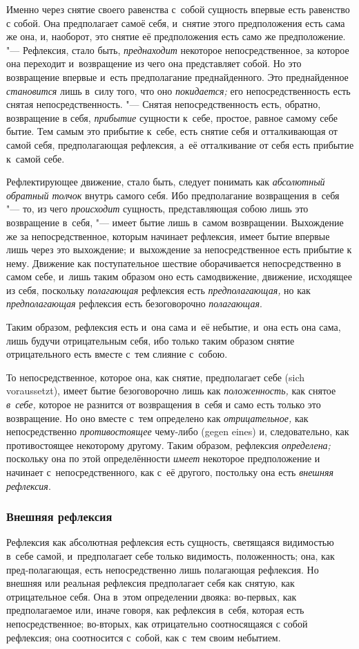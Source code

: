 Именно через снятие своего равенства с~собой сущность впервые есть равенство
с собой. Она предполагает самоё себя, и~снятие этого предположения есть
сама же она, и, наоборот, это снятие её предположения есть само же
предположение. "--- Рефлексия, стало быть,
{\em преднаходит} некоторое непосредственное, за
которое она переходит и~возвращение из чего она представляет собой. Но это
возвращение впервые и~есть предполагание преднайденного. Это преднайденное
{\em становится} лишь в~силу того, что оно
{\em покидается;} его непосредственность есть снятая
непосредственность. "--- Снятая непосредственность есть, обратно, возвращение
в себя, {\em прибытие} сущности к~себе, простое, равное
самому себе бытие. Тем самым это прибытие к~себе, есть снятие себя и
отталкивающая от самой себя, предполагающая рефлексия, а~её отталкивание от
себя есть прибытие к~самой себе.

Рефлектирующее движение, стало быть, следует понимать как
{\em абсолютный обратный толчок} внутрь самого себя.
Ибо предполагание возвращения в~себя "--- то, из чего
{\em происходит} сущность, представляющая собою лишь
это возвращение в~себя, "--- имеет бытие лишь в~самом возвращении. Выхождение
же за непосредственное, которым начинает рефлексия, имеет бытие впервые
лишь через это выхождение; и~выхождение за непосредственное есть прибытие к
нему. Движение как поступательное шествие оборачивается непосредственно в
самом себе, и~лишь таким образом оно есть самодвижение, движение, исходящее
из себя, поскольку {\em полагающая} рефлексия есть
{\em предполагающая,} но как
{\em предполагающая} рефлексия есть безоговорочно
{\em полагающая}.

Таким образом, рефлексия есть и~она сама и~её небытие, и~она есть она сама,
лишь будучи отрицательным себя, ибо только таким образом снятие
отрицательного есть вместе с~тем слияние с~собою.

То непосредственное, которое она, как снятие, предполагает себе (sich
voraussetzt), имеет бытие безоговорочно лишь как
{\em положенность,} как снятое
{\em в~себе,} которое не разнится от возвращения в~себя
и само есть только это возвращение. Но оно вместе с~тем определено как
{\em отрицательное,} как непосредственно
{\em противостоящее} чему-либо (gegen eines) и,
следовательно, как противостоящее некоторому другому. Таким образом,
рефлексия {\em определена;} поскольку она по этой
определённости {\em имеет} некоторое предположение и
начинает с~непосредственного, как с~её другого, постольку она есть
{\em внешняя рефлексия}.

\subsubsection{Внешняя рефлексия}
Рефлексия как абсолютная рефлексия есть
сущность, светящаяся видимостью в~себе самой, и~предполагает себе только
видимость, положенность; она, как пред-полагающая, есть непосредственно
лишь полагающая рефлексия. Но внешняя или реальная рефлексия предполагает
себя как снятую, как отрицательное себя. Она в~этом определении двояка:
во-первых, как предполагаемое или, иначе говоря, как рефлексия в~себя,
которая есть непосредственное; во-вторых, как отрицательно соотносящаяся с
собой рефлексия; она соотносится с~собой, как с~тем своим небытием.

